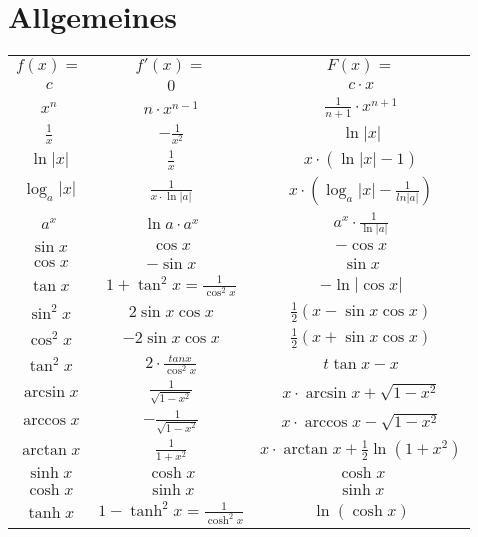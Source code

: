 \chapter{Allgemeines}
  \begin{example}
  	\renewcommand{\arraystretch}{1.5}
    \begin{tabular}{| c | c | c |}
          \hline 
      $f(x) = $         & $f'(x) = $                            & $F(x) = $\\ %
          \hhline{|=|=|=|}
      $c$               & $0$                                   & $c\cdot x$\\
          \hline
      $x^n$             & $n\cdot x^{n-1}$                      & $\frac{1}{n+1} \cdot x^{n+1}$\\
          \hline
      $\frac{1}{x}$     & $-\frac{1}{x^2}$                      & $\ln{|x|}$\\
          \hline
      $\ln{|x|}$        & $\frac{1}{x}$                         & $x \cdot (\ln{|x|}-1)$\\
          \hline
      $\log_a{|x|}$     & $\frac{1}{x \cdot \ln{|a|}}$          & $x \cdot (\log_a{|x|}-\frac{1}{ln{|a|}})$\\
          \hline
      $a^x$             & $\ln a\cdot a^x$                      & $a^x \cdot \frac{1}{\ln|a|}$\\
          \hline
      $\sin x$          & $\cos x$                              & $-\cos x$\\
          \hline
      $\cos x$          & $-\sin x$                             & $\sin x$\\
          \hline
      $\tan x$          & $1 + \tan^2 x = \frac{1}{\cos^2 x}$   & $-\ln|\cos x|$\\
          \hline
      $\sin^2 x$        & $2\sin x\cos x$                       & $\frac{1}{2}(x-\sin x\cos x)$\\
          \hline
      $\cos^2 x$        & $-2\sin x\cos x$                      & $\frac{1}{2}(x+\sin x\cos x)$\\
          \hline
      $\tan^2 x$        & $2 \cdot \frac{tan x}{\cos^2 x}$      & $t\tan x - x$\\
          \hline
      $\arcsin x$       & $\frac{1}{\sqrt{1-x^2}}$              & $x \cdot \arcsin{x} + \sqrt{1-x^2}$\\
          \hline
      $\arccos x$       & $-\frac{1}{\sqrt{1-x^2}}$             & $x \cdot \arccos{x} - \sqrt{1-x^2}$\\
          \hline
      $\arctan x$       & $\frac{1}{1+x^2}$                     & $x \cdot \arctan{x} + \frac{1}{2}\ln{(1+x^2)}$\\
          \hline
      $\sinh x$         & $\cosh x$                             & $\cosh x$\\
          \hline
      $\cosh x$         & $\sinh x$                             & $\sinh x$\\
          \hline
      $\tanh x$         & $1 - \tanh^2 x = \frac{1}{\cosh^2 x}$ & $\ln{(\cosh x)}$\\
          \hline
    \end{tabular}
  \end{example}
  

